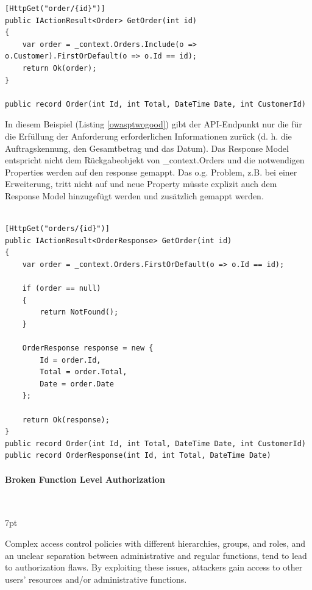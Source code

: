\documentclass[notitlepage, hidelinks]{article}
\newenvironment{formal}{%
  \def\FrameCommand{%
    \hspace{1pt}%
    {\color{black}\vrule width 2pt}%
    {\color{formalshade}\vrule width 4pt}%
    \colorbox{formalshade}%
  }%
  \MakeFramed{\advance\hsize-\width\FrameRestore}%
  \noindent\hspace{-4.55pt}%
  \begin{adjustwidth}{}{7pt}%
  \vspace{2pt}\vspace{2pt}%
}
{%
  \vspace{2pt}\end{adjustwidth}\endMakeFramed%
}
\begin{document}
\begin{lstlisting}[language={[Sharp]C},frame=single,caption=Negativbeispiel Excessive Data Exposure,label=owasptwobad]
[HttpGet("order/{id}")]
public IActionResult<Order> GetOrder(int id)
{
    var order = _context.Orders.Include(o => o.Customer).FirstOrDefault(o => o.Id == id);
    return Ok(order);
}

public record Order(int Id, int Total, DateTime Date, int CustomerId)
\end{lstlisting}

In diesem Beispiel (Listing \ref{owasptwogood}) gibt der API-Endpunkt nur die für die Erfüllung der Anforderung erforderlichen Informationen zurück (d. h. die Auftragskennung, den Gesamtbetrag und das Datum). Das Response Model entspricht nicht dem Rückgabeobjekt von \_context.Orders und die notwendigen Properties werden auf den response gemappt. Das o.g. Problem, z.B. bei einer Erweiterung, tritt nicht auf und neue Property müsste explizit auch dem Response Model hinzugefügt werden und zusätzlich gemappt werden.

\begin{lstlisting}[language={[Sharp]C},frame=single,caption=Positivbeispiel Excessive Data Exposure,label=owasptwogood]

[HttpGet("orders/{id}")]
public IActionResult<OrderResponse> GetOrder(int id)
{
    var order = _context.Orders.FirstOrDefault(o => o.Id == id);

    if (order == null)
    {
        return NotFound();
    }

    OrderResponse response = new {
        Id = order.Id,
        Total = order.Total,
        Date = order.Date
    };

    return Ok(response);
}
public record Order(int Id, int Total, DateTime Date, int CustomerId)
public record OrderResponse(int Id, int Total, DateTime Date)
\end{lstlisting}


\paragraph{Broken Function Level Authorization} \mbox{} \\
\begin{formal}
Complex access control policies with different hierarchies, groups, and roles, and an unclear separation between administrative and regular functions, tend to lead to authorization flaws. By exploiting these issues, attackers gain access to other users’ resources and/or administrative functions.
\end{formal}
\end{document}
